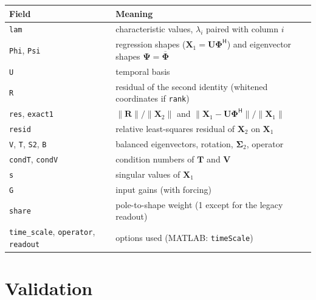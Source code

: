\documentclass[report]{nld}
\theoremstyle{remark}\newtheorem*{remark}{Remark}
\newcommand{\V}{\mathbf{V}}
\newcommand{\T}{\mathbf{T}}
\newcommand{\X}{\mathbf{X}}
\newcommand{\U}{\mathbf{U}}
\newcommand{\R}{\mathbf{R}}
\newcommand{\Sg}{\symbf{\Sigma}}
\newcommand{\Ph}{\symbf{\Phi}}
\newcommand{\Ps}{\symbf{\Psi}}
\renewcommand{\H}{\mathsf{H}}
\newcommand{\code}[1]{\texttt{#1}}
\begin{document}
\begin{center}\small
\begin{tabularx}{\linewidth}{@{}>{\raggedright}p{2.8cm}X@{}}
\toprule
Field & Meaning\\
\midrule
\code{lam} & characteristic values, $\lambda_i$ paired with column $i$\\
\code{Phi}, \code{Psi} & regression shapes ($\X_1=\U\Ph^\H$) and eigenvector shapes $\Ps=\overline{\Ph}$\\
\code{U} & temporal basis\\
\code{R} & residual of the second identity (whitened coordinates if \code{rank})\\
\code{res}, \code{exact1} & $\|\R\|/\|\X_2\|$ and $\|\X_1-\U\Ph^\H\|/\|\X_1\|$\\
\code{resid} & relative least-squares residual of $\X_2$ on $\X_1$\\
\code{V}, \code{T}, \code{S2}, \code{B} & balanced eigenvectors, rotation, $\Sg_2$, operator\\
\code{condT}, \code{condV} & condition numbers of $\T$ and $\V$\\
\code{s} & singular values of $\X_1$\\
\code{G} & input gains (with forcing)\\
\code{share} & pole-to-shape weight (1 except for the legacy readout)\\
\code{time\_scale}, \code{operator}, \code{readout} & options used (MATLAB: \code{timeScale})\\
\bottomrule
\end{tabularx}
\end{center}

\section{Validation}
\end{document}
